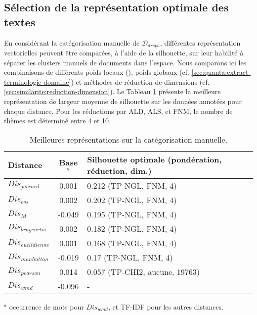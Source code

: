 %	
 

\subsection{Sélection de la représentation optimale des textes}
\label{sec:similarite:select-repr-optimal}
En considérant la catégorisation manuelle de $\mathcal{D}_{arcpa}$, différentes représentation vectorielles peuvent être comparées, à l'aide de la silhouette, sur leur habilité à séparer les clusters manuels de documents dans l'espace. Nous comparons ici les combinaisons de différents poids locaux (), poids globaux (cf. \ref{sec:quanta:extract-terminologie-domaine}) et méthodes de réduction de dimensions (cf. \ref{sec:similarite:reduction-dimension}). 
Le Tableau \ref{tab:similarite:silhouette-vecteur-manuel} présente la meilleure représentation de largeur moyenne de silhouette sur les données annotées pour chaque distance. Pour les réductions par ALD, ALS, et FNM, le nombre de thèmes est déterminé entre 4 et 10.

\begin{table}[!htb]
	\small
	\begin{center}
	\begin{tabular}[pos]{|l|c|p{}|}
		\hline
		\textbf{Distance}&\textbf{Base$^a$}&\textbf{Silhouette optimale   (pondération, réduction, dim.)} \\ \hline
		$Dis_{jaccard}$ & 0.001 & 0.212 (TP-NGL, FNM, 4) \\ \hline
		$Dis_{cos}$ & 0.002 & 0.202 (TP-NGL, FNM, 4) \\ \hline
		$Dis_{M}$ & -0.049 & 0.195 (TP-NGL, FNM, 4) \\ \hline
		$Dis_{braycurtis}$ & 0.002& 0.182 (TP-NGL, FNM, 4) \\ \hline
		$Dis_{euclidienne}$ & 0.001& 0.168  (TP-NGL, FNM, 4) \\ \hline
		$Dis_{manhattan}$ & -0.019& 0.17   (TP-NGL, FNM, 4) \\ \hline
		$Dis_{pearson}$ & 0.014 & 0.057 (TP-CHI2, aucune, 19763) \\ \hline
		$Dis_{wmd}$ & -0.096 &  - \\ \hline
	\end{tabular}				
\end{center}

	$^a$ occurrence de mots pour $Dis_{wmd}$, et TF-IDF pour les autres distances.
    \caption{Meilleures représentations sur la catégorisation manuelle.} \label{tab:similarite:silhouette-vecteur-manuel}
\end{table}

